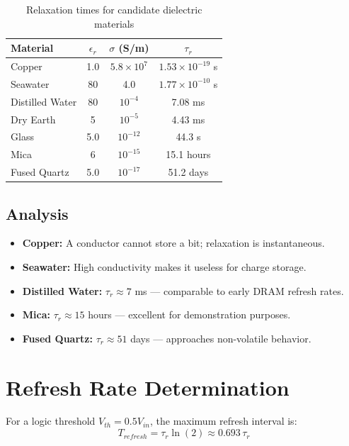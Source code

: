 \documentclass[12pt,a4paper]{report}
\begin{document}
\begin{table}[H]
    \centering
    \caption{Relaxation times for candidate dielectric materials}
    \label{tab:materials}
    \begin{tabular}{@{}lccc@{}}
        \toprule
        \textbf{Material} & $\epsilon_r$ & $\sigma$ (S/m) & $\tau_r$ \\
        \midrule
        Copper & 1.0 & $5.8 \times 10^7$ & $1.53 \times 10^{-19}$ s \\
        Seawater & 80 & 4.0 & $1.77 \times 10^{-10}$ s \\
        Distilled Water & 80 & $10^{-4}$ & 7.08 ms \\
        Dry Earth & 5 & $10^{-5}$ & 4.43 ms \\
        Glass & 5.0 & $10^{-12}$ & 44.3 s \\
        Mica & 6 & $10^{-15}$ & 15.1 hours \\
        Fused Quartz & 5.0 & $10^{-17}$ & 51.2 days \\
        \bottomrule
    \end{tabular}
\end{table}

\subsection{Analysis}

\begin{itemize}
    \item \textbf{Copper:} A conductor cannot store a bit; relaxation is instantaneous.
    \item \textbf{Seawater:} High conductivity makes it useless for charge storage.
    \item \textbf{Distilled Water:} $\tau_r \approx 7$ ms --- comparable to early DRAM refresh rates.
    \item \textbf{Mica:} $\tau_r \approx 15$ hours --- excellent for demonstration purposes.
    \item \textbf{Fused Quartz:} $\tau_r \approx 51$ days --- approaches non-volatile behavior.
\end{itemize}

\section{Refresh Rate Determination}

For a logic threshold $V_{th} = 0.5 V_{in}$, the maximum refresh interval is:
\begin{equation}
    T_{refresh} = \tau_r \ln(2) \approx 0.693 \, \tau_r
    \label{eq:refresh_final}
\end{equation}
\end{document}
